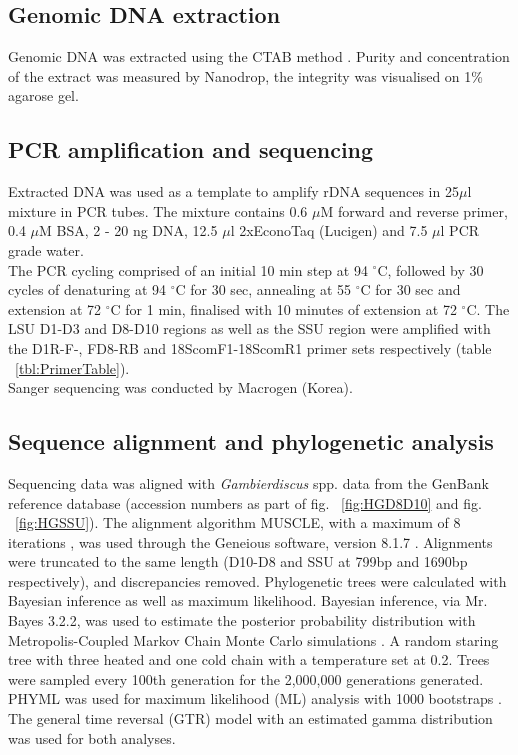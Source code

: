 \documentclass[12pt]{article}
\begin{document}
\subsection{Genomic DNA extraction}
Genomic DNA was extracted using the CTAB method \citep{zhou1999analysis}. Purity and concentration of the extract was measured by Nanodrop, the integrity was visualised on 1\% agarose gel.

\subsection{PCR amplification and sequencing}
Extracted DNA was used as a template to amplify rDNA sequences in 25$\mu$l mixture in PCR tubes. The mixture contains 0.6 $\mu$M forward and reverse primer, 0.4 $\mu$M BSA, 2 - 20 ng DNA, 12.5 $\mu$l 2xEconoTaq (Lucigen) and 7.5 $\mu$l PCR grade water.\\
The PCR cycling comprised of an initial 10 min step at 94 $^{\circ}$C, followed by 30 cycles of denaturing at 94 $^{\circ}$C for 30 sec, annealing at 55 $^{\circ}$C for 30 sec and extension at 72 $^{\circ}$C for 1 min, finalised with 10 minutes of extension at 72 $^{\circ}$C.
The LSU D1-D3  and D8-D10 regions as well as the SSU region were amplified with the D1R-F-, FD8-RB and 18ScomF1-18ScomR1 primer sets respectively (table ~\ref{tbl:PrimerTable}).\\
Sanger sequencing was conducted by Macrogen (Korea).


\subsection{Sequence alignment and phylogenetic analysis}
Sequencing data was aligned with \emph{Gambierdiscus} spp. data from the GenBank reference database (accession numbers as part of fig. ~\ref{fig:HGD8D10} and fig. ~\ref{fig:HGSSU}). The alignment algorithm MUSCLE, with a maximum of 8 iterations \citep{edgar2004muscle}, was used through the Geneious software, version 8.1.7 \citep{kearse2012geneious}. Alignments were truncated to the same length (D10-D8 and SSU at 799bp and 1690bp respectively), and discrepancies removed.
Phylogenetic trees were calculated with Bayesian inference as well as maximum likelihood. Bayesian inference, via Mr. Bayes 3.2.2, was used to estimate the posterior probability distribution with Metropolis-Coupled Markov Chain Monte Carlo simulations \citep{ronquist2003mrbayes}. A random staring tree with three heated and one cold chain with a temperature set at 0.2. Trees were sampled every 100th generation for the 2,000,000 generations generated.
PHYML was used for maximum likelihood (ML) analysis with 1000 bootstraps \citep{guindon2003simple}.
The general time reversal (GTR) model with an estimated gamma distribution was used for both analyses.\\
\end{document}

